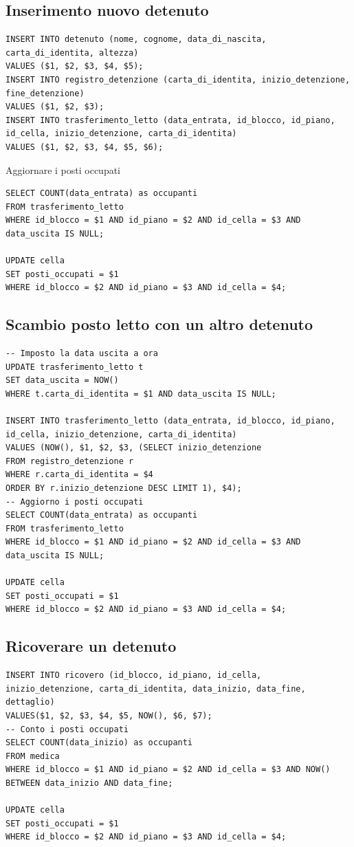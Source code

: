 \documentclass[a4paper,12pt]{report}
\begin{document}
\subsection{Inserimento nuovo detenuto}
\begin{verbatim}
INSERT INTO detenuto (nome, cognome, data_di_nascita, carta_di_identita, altezza)
VALUES ($1, $2, $3, $4, $5);
INSERT INTO registro_detenzione (carta_di_identita, inizio_detenzione, fine_detenzione)
VALUES ($1, $2, $3);
INSERT INTO trasferimento_letto (data_entrata, id_blocco, id_piano, id_cella, inizio_detenzione, carta_di_identita)
VALUES ($1, $2, $3, $4, $5, $6);
\end{verbatim}
Aggiornare i posti occupati
\begin{verbatim}
SELECT COUNT(data_entrata) as occupanti
FROM trasferimento_letto
WHERE id_blocco = $1 AND id_piano = $2 AND id_cella = $3 AND data_uscita IS NULL;

UPDATE cella
SET posti_occupati = $1
WHERE id_blocco = $2 AND id_piano = $3 AND id_cella = $4;
\end{verbatim}
\subsection{Scambio posto letto con un altro detenuto}
\begin{verbatim}
-- Imposto la data uscita a ora
UPDATE trasferimento_letto t
SET data_uscita = NOW()
WHERE t.carta_di_identita = $1 AND data_uscita IS NULL;

INSERT INTO trasferimento_letto (data_entrata, id_blocco, id_piano, id_cella, inizio_detenzione, carta_di_identita)
VALUES (NOW(), $1, $2, $3, (SELECT inizio_detenzione
FROM registro_detenzione r
WHERE r.carta_di_identita = $4
ORDER BY r.inizio_detenzione DESC LIMIT 1), $4);
-- Aggiorno i posti occupati
SELECT COUNT(data_entrata) as occupanti
FROM trasferimento_letto
WHERE id_blocco = $1 AND id_piano = $2 AND id_cella = $3 AND data_uscita IS NULL;

UPDATE cella
SET posti_occupati = $1
WHERE id_blocco = $2 AND id_piano = $3 AND id_cella = $4;
\end{verbatim}
\subsection{Ricoverare un detenuto}
\begin{verbatim}
INSERT INTO ricovero (id_blocco, id_piano, id_cella, inizio_detenzione, carta_di_identita, data_inizio, data_fine, dettaglio)
VALUES($1, $2, $3, $4, $5, NOW(), $6, $7);
-- Conto i posti occupati
SELECT COUNT(data_inizio) as occupanti
FROM medica
WHERE id_blocco = $1 AND id_piano = $2 AND id_cella = $3 AND NOW() BETWEEN data_inizio AND data_fine;

UPDATE cella
SET posti_occupati = $1
WHERE id_blocco = $2 AND id_piano = $3 AND id_cella = $4;
\end{verbatim}
\end{document}
